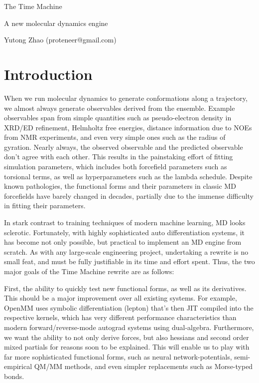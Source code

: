 \documentclass{article}
\begin{document}
\centerline{\sc \large The Time Machine}
\vspace{.5pc}
\centerline{A new molecular dynamics engine}
\vspace{.5pc}
\centerline{Yutong Zhao (proteneer@gmail.com)}
\vspace{2pc}

\section{Introduction}

When we run molecular dynamics to generate conformations along a trajectory, we almost always generate observables derived from the ensemble. Example observables span from simple quantities such as pseudo-electron density in XRD/ED refinement, Helmholtz free energies, distance information due to NOEs from NMR experiments, and even very simple ones such as the radius of gyration. Nearly always, the observed observable and the predicted observable don't agree with each other. This results in the painstaking effort of fitting simulation parameters, which includes both forcefield parameters such as torsional terms, as well as hyperparameters such as the lambda schedule. Despite known pathologies, the functional forms and their parameters in classic MD forcefields have barely changed in decades, partially due to the immense difficulty in fitting their parameters.

In stark contrast to training techniques of modern machine learning, MD looks sclerotic. Fortunately, with highly sophisticated auto differentiation systems, it has become not only possible, but practical to implement an MD engine from scratch. As with any large-scale engineering project, undertaking a rewrite is no small feat, and must be fully justifiable in its time and effort spent. Thus, the two major goals of the Time Machine rewrite are as follows:

First, the ability to quickly test new functional forms, as well as its derivatives. This should be a major improvement over all existing systems. For example, OpenMM uses symbolic differentiation (lepton) that's then JIT compiled into the respective kernels, which has very different performance characteristics than modern forward/reverse-mode autograd systems using dual-algebra. Furthermore, we want the ability to not only derive forces, but also hessians and second order mixed partials for reasons soon to be explained. This will enable us to play with far more sophisticated functional forms, such as neural network-potentials, semi-empirical QM/MM methods, and even simpler replacements such as Morse-typed bonds.
\end{document}
